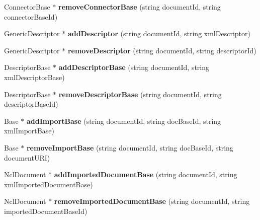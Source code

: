\begin{CompactItemize}
\item 
ConnectorBase $\ast$ \textbf{removeConnectorBase} (string documentId, string connectorBaseId)\label{classbr_1_1pucrio_1_1telemidia_1_1ginga_1_1ncl_1_1PrivateBaseContext_eadc9d5e322e934e9ab7db1b9f7c0436}

\item 
GenericDescriptor $\ast$ \textbf{addDescriptor} (string documentId, string xmlDescriptor)\label{classbr_1_1pucrio_1_1telemidia_1_1ginga_1_1ncl_1_1PrivateBaseContext_ce5a78d3e81f33420cb2ba391ec99948}

\item 
GenericDescriptor $\ast$ \textbf{removeDescriptor} (string documentId, string descriptorId)\label{classbr_1_1pucrio_1_1telemidia_1_1ginga_1_1ncl_1_1PrivateBaseContext_338c6b6118d0127b2d0c3baf65853a94}

\item 
DescriptorBase $\ast$ \textbf{addDescriptorBase} (string documentId, string xmlDescriptorBase)\label{classbr_1_1pucrio_1_1telemidia_1_1ginga_1_1ncl_1_1PrivateBaseContext_c0f903fe477853764170bcd07eb8103d}

\item 
DescriptorBase $\ast$ \textbf{removeDescriptorBase} (string documentId, string descriptorBaseId)\label{classbr_1_1pucrio_1_1telemidia_1_1ginga_1_1ncl_1_1PrivateBaseContext_1c5809c5f42f888e39696182aa4d5c02}

\item 
Base $\ast$ \textbf{addImportBase} (string documentId, string docBaseId, string xmlImportBase)\label{classbr_1_1pucrio_1_1telemidia_1_1ginga_1_1ncl_1_1PrivateBaseContext_5f390e05f5e0746ff24b3cc4277b3a02}

\item 
Base $\ast$ \textbf{removeImportBase} (string documentId, string docBaseId, string documentURI)\label{classbr_1_1pucrio_1_1telemidia_1_1ginga_1_1ncl_1_1PrivateBaseContext_24ac4045fc9659ea929263a8dae63fd6}

\item 
NclDocument $\ast$ \textbf{addImportedDocumentBase} (string documentId, string xmlImportedDocumentBase)\label{classbr_1_1pucrio_1_1telemidia_1_1ginga_1_1ncl_1_1PrivateBaseContext_67bc061d4662a6ea0cb0e7f04fca2b8e}

\item 
NclDocument $\ast$ \textbf{removeImportedDocumentBase} (string documentId, string importedDocumentBaseId)\label{classbr_1_1pucrio_1_1telemidia_1_1ginga_1_1ncl_1_1PrivateBaseContext_dcaca18dc569f437b7cf8cc08d9c1b75}


\end{CompactItemize}
